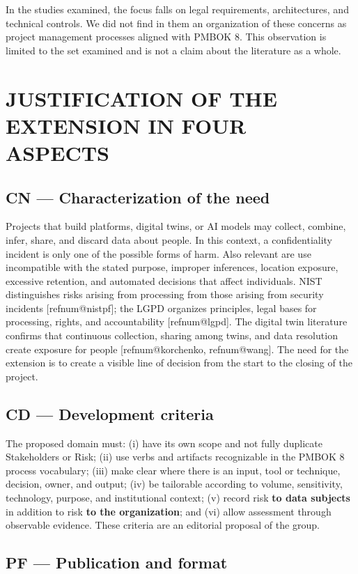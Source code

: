 \documentclass[12pt,a4paper,article,oneside,brazil,english]{abntex2}
\makeatletter
\newcommand{\refnum}[1]{\csname refnum@#1\endcsname}
\makeatother
\begin{document}
In the studies examined, the focus falls on legal requirements, architectures, and technical controls. We did not find in them an organization of these concerns as project management processes aligned with PMBOK 8. This observation is limited to the set examined and is not a claim about the literature as a whole.

\section{JUSTIFICATION OF THE EXTENSION IN FOUR ASPECTS}
\subsection{CN — Characterization of the need}

Projects that build platforms, digital twins, or AI models may collect, combine, infer, share, and discard data about people. In this context, a confidentiality incident is only one of the possible forms of harm. Also relevant are use incompatible with the stated purpose, improper inferences, location exposure, excessive retention, and automated decisions that affect individuals. NIST distinguishes risks arising from processing from those arising from security incidents [\refnum{nistpf}]; the LGPD organizes principles, legal bases for processing, rights, and accountability [\refnum{lgpd}]. The digital twin literature confirms that continuous collection, sharing among twins, and data resolution create exposure for people [\refnum{korchenko}, \refnum{wang}]. The need for the extension is to create a visible line of decision from the start to the closing of the project.
\subsection{CD — Development criteria}

The proposed domain must: (i) have its own scope and not fully duplicate Stakeholders or Risk; (ii) use verbs and artifacts recognizable in the PMBOK 8 process vocabulary; (iii) make clear where there is an input, tool or technique, decision, owner, and output; (iv) be tailorable according to volume, sensitivity, technology, purpose, and institutional context; (v) record risk \textbf{to data subjects} in addition to risk \textbf{to the organization}; and (vi) allow assessment through observable evidence. These criteria are an editorial proposal of the group.
\subsection{PF — Publication and format}
\end{document}
